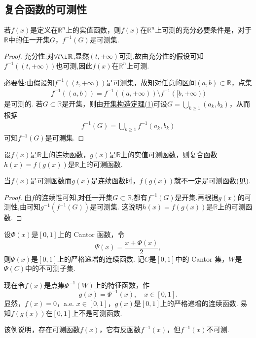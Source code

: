 \documentclass[../../main.tex]{subfiles}%
\begin{document}
\subsection{复合函数的可测性}

\begin{lemma}\label{lemma:函数可测的充要条件1}
若\(f(x)\)是定义在\(\mathbb{R}^{n}\)上的实值函数，则\(f(x)\)在\(\mathbb{R}^{n}\)上可测的充分必要条件是，对于\(\mathbb{R}\)中的任一开集\(G\)，\(f^{-1}(G)\)是可测集.
\end{lemma}
\begin{proof}

{\heiti 充分性:}对$\forall t\i \mathbb{R}$,显然$(t,+\infty)$可测,故由充分性的假设可知$f^{-1}((t,+\infty))$也可测,因此$f(x)$在$\mathbb{R}^n$上可测.

{\heiti 必要性:}由假设知\(f^{-1}((t, +\infty))\)是可测集，故知对任意的区间\((a, b) \subset \mathbb{R}\)，点集
\begin{align*}
f^{-1}((a, b)) = f^{-1}((a, +\infty)) \setminus f^{-1}([b, +\infty))
\end{align*}
是可测的. 若\(G \subset \mathbb{R}\)是开集，则由\hyperref[theorem:开集构造定理]{开集构造定理(1)}可设\(G = \bigcup_{k \geqslant 1} (a_k, b_k)\)，从而根据
\begin{align*}
f^{-1}(G) = \bigcup_{k \geqslant 1} f^{-1}(a_k, b_k)
\end{align*}
可知\(f^{-1}(G)\)是可测集.
\end{proof}

\begin{theorem}\label{theorem:连续函数复合可测函数也可测}
设\(f(x)\)是\(\mathbb{R}\)上的连续函数，\(g(x)\)是\(\mathbb{R}\)上的实值可测函数，则复合函数\(h(x) = f(g(x))\)是\(\mathbb{R}\)上的可测函数.
\end{theorem}
\begin{remark}
当\(f(x)\)是可测函数而\(g(x)\)是连续函数时，\(f(g(x))\)就不一定是可测函数(见).
\end{remark}
\begin{proof}
由$f$的连续性可知,对任一开集\(G \subset \mathbb{R}\),都有\(f^{-1}(G)\)是开集.再根据\(g(x)\)的可测性,由可知\(g^{-1}(f^{-1}(G))\)是可测集. 这说明\(h(x) = f(g(x))\)是\(\mathbb{R}\)上的可测函数. 
\end{proof}

\begin{example}\label{example:复合函数的可测性反例1}
设\(\varPhi(x)\)是\([0, 1]\)上的 Cantor 函数，令
\[
\varPsi(x)=\frac{x+\varPhi(x)}{2},
\]
则\(\varPsi(x)\)是\([0, 1]\)上的严格递增的连续函数. 记\(C\)是\([0, 1]\)中的 Cantor 集，\(W\)是\(\varPsi(C)\)中的不可测子集.

现在令\(f(x)\)是点集\(\varPsi^{-1}(W)\)上的特征函数，作
\[
g(x)=\varPsi^{-1}(x),\quad x\in[0, 1].
\]
显然，\(f(x) = 0\)，a.e. \(x \in [0, 1]\)，\(g(x)\)是\([0, 1]\)上的严格递增的连续函数. 易知\(f(g(x))\)在\([0, 1]\)上不是可测函数.
\end{example}
\begin{remark}
该例说明，存在可测函数\(f(x)\)，它有反函数\(f^{-1}(x)\)，但\(f^{-1}(x)\)不可测. 
\end{remark}
\end{document}
